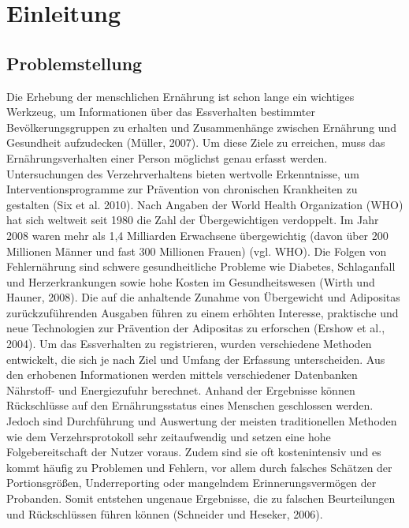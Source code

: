 
\section{Einleitung}

\subsection{Problemstellung}
Die Erhebung der menschlichen  Ernährung ist schon lange ein wichtiges Werkzeug, um Informationen über das Essverhalten bestimmter Bevölkerungsgruppen zu erhalten und Zusammenhänge zwischen Ernährung und Gesundheit aufzudecken (Müller, 2007).
Um diese Ziele zu erreichen, muss das Ernährungsverhalten einer Person möglichst genau erfasst werden. Untersuchungen des Verzehrverhaltens bieten wertvolle Erkenntnisse, um Interventionsprogramme zur Prävention von chronischen Krankheiten zu gestalten (Six et al. 2010). Nach  Angaben der World Health Organization (WHO) hat sich weltweit seit 1980 die Zahl der Übergewichtigen verdoppelt. Im Jahr 2008 waren mehr als 1,4 Milliarden Erwachsene übergewichtig (davon über 200 Millionen Männer und fast 300 Millionen Frauen) (vgl. WHO). Die Folgen von Fehlernährung sind schwere gesundheitliche Probleme wie Diabetes, Schlaganfall und Herzerkrankungen sowie hohe Kosten im Gesundheitswesen (Wirth und Hauner, 2008). Die auf die anhaltende Zunahme von Übergewicht und Adipositas zurückzuführenden Ausgaben führen zu einem erhöhten Interesse, praktische und neue Technologien zur Prävention der Adipositas zu erforschen (Ershow et al., 2004). Um das Essverhalten zu registrieren, wurden verschiedene Methoden entwickelt, die sich je nach Ziel und Umfang der Erfassung unterscheiden. Aus den erhobenen Informationen werden mittels verschiedener Datenbanken Nährstoff- und Energiezufuhr berechnet. Anhand der Ergebnisse können Rückschlüsse auf den Ernährungsstatus eines Menschen geschlossen werden. Jedoch sind Durchführung und Auswertung der meisten traditionellen Methoden wie dem Verzehrsprotokoll sehr zeitaufwendig und setzen eine hohe Folgebereitschaft der Nutzer voraus. Zudem sind sie oft kostenintensiv und es kommt häufig zu Problemen und Fehlern, vor allem durch falsches Schätzen der Portionsgrößen, Underreporting oder mangelndem Erinnerungsvermögen der Probanden. Somit entstehen ungenaue Ergebnisse, die zu falschen Beurteilungen und Rückschlüssen führen können (Schneider und Heseker, 2006).


